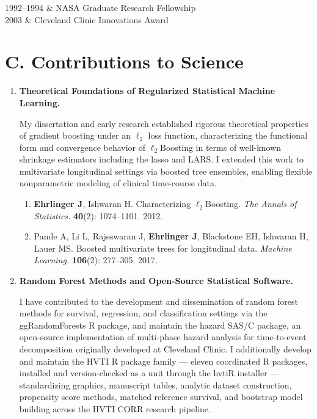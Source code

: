 \documentclass{nihbiosketch}
\begin{document}
\begin{datetbl}
1992--1994  & NASA Graduate Research Fellowship \\
2003        & Cleveland Clinic Innovations Award \\
\end{datetbl}

\section*{C. Contributions to Science}

\begin{enumerate}

\item \textbf{Theoretical Foundations of Regularized Statistical Machine Learning.}

My dissertation and early research established rigorous theoretical properties
of gradient boosting under an $\ell_2$ loss function, characterizing the
functional form and convergence behavior of $\ell_2$Boosting in terms of
well-known shrinkage estimators including the lasso and LARS. I extended this
work to multivariate longitudinal settings via boosted tree ensembles, enabling
flexible nonparametric modeling of clinical time-course data.

\begin{enumerate}
\item \textbf{Ehrlinger J}, Ishwaran H. Characterizing $\ell_2$Boosting.
\textit{The Annals of Statistics.} \textbf{40}(2): 1074--1101. 2012.

\item Pande A, Li L, Rajeswaran J, \textbf{Ehrlinger J}, Blackstone EH,
Ishwaran H, Lauer MS. Boosted multivariate trees for longitudinal data.
\textit{Machine Learning.} \textbf{106}(2): 277--305. 2017.
\end{enumerate}

\item \textbf{Random Forest Methods and Open-Source Statistical Software.}

I have contributed to the development and dissemination of random forest
methods for survival, regression, and classification settings via the
ggRandomForests R package, and maintain the hazard SAS/C package, an
open-source implementation of multi-phase hazard analysis for time-to-event
decomposition originally developed at Cleveland Clinic. I additionally develop
and maintain the HVTI R package family — eleven coordinated R packages,
installed and version-checked as a unit through the hvtiR installer —
standardizing graphics, manuscript tables, analytic dataset construction,
propensity score methods, matched reference survival, and bootstrap model
building across the HVTI CORR research pipeline.


\end{enumerate}
\end{document}

